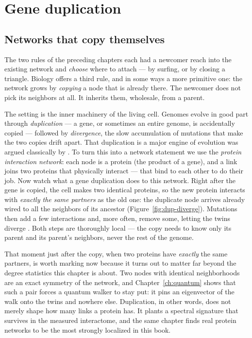\chapter{Gene duplication}
\label{ch:duplication}

\section{Networks that copy themselves}

The two rules of the preceding chapters each had a newcomer reach into the
existing network and \emph{choose} where to attach --- by surfing, or by closing
a triangle. Biology offers a third rule, and in some ways a more primitive one:
the network grows by \emph{copying} a node that is already there. The newcomer
does not pick its neighbors at all. It inherits them, wholesale, from a parent.

The setting is the inner machinery of the living cell. Genomes evolve in good
part through \emph{duplication} --- a gene, or sometimes an entire genome, is
accidentally copied --- followed by \emph{divergence}, the slow accumulation of
mutations that make the two copies drift apart. That duplication is a major
engine of evolution was argued classically by \citet{ohno1970}. To turn this into
a network statement we use the \emph{protein interaction network}: each node is a
protein (the product of a gene), and a link joins two proteins that physically
interact --- that bind to each other to do their job. Now watch what a gene
duplication does to this network. Right after the gene is copied, the cell makes
two identical proteins, so the new protein interacts with \emph{exactly the same
partners} as the old one: the duplicate node arrives already wired to all the
neighbors of its ancestor (Figure~\ref{fig:dup-diverge}). Mutations then add a few
interactions and, more often,
remove some, letting the twins diverge \citep{wagner2001,sole2002}. Both steps
are thoroughly local --- the copy needs to know only its parent and its parent's
neighbors, never the rest of the genome.

That moment just after the copy, when two proteins have \emph{exactly} the same
partners, is worth marking now because it turns out to matter far beyond the degree
statistics this chapter is about. Two nodes with identical neighborhoods are an exact
symmetry of the network, and Chapter~\ref{ch:quantum} shows that such a pair forces a
quantum walker to stay put: it pins an eigenvector of the walk onto the twins and
nowhere else. Duplication, in other words, does not merely shape how many links a
protein has. It plants a spectral signature that survives in the measured
interactome, and the same chapter finds real protein networks to be the most strongly
localized in this book.

